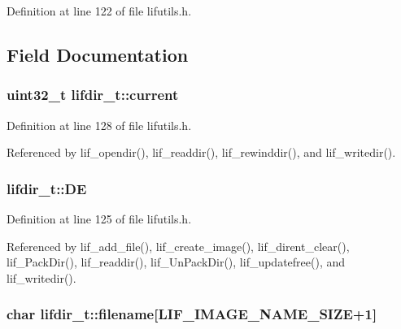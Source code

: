 Definition at line 122 of file lifutils.\+h.



\subsection{Field Documentation}
\subsubsection[{\texorpdfstring{current}{current}}]{\setlength{\rightskip}{0pt plus 5cm}uint32\+\_\+t lifdir\+\_\+t\+::current}\hypertarget{structlifdir__t_ae885e86a62d50c5b0c99ad2b63120e2c}{}\label{structlifdir__t_ae885e86a62d50c5b0c99ad2b63120e2c}


Definition at line 128 of file lifutils.\+h.



Referenced by lif\+\_\+opendir(), lif\+\_\+readdir(), lif\+\_\+rewinddir(), and lif\+\_\+writedir().

\subsubsection[{\texorpdfstring{DE}{DE}}]{ lifdir\+\_\+t\+::\+DE}\hypertarget{structlifdir__t_af9247c1579ce3fe0c57db9fd6b56c232}{}\label{structlifdir__t_af9247c1579ce3fe0c57db9fd6b56c232}


Definition at line 125 of file lifutils.\+h.



Referenced by lif\+\_\+add\+\_\+file(), lif\+\_\+create\+\_\+image(), lif\+\_\+dirent\+\_\+clear(), lif\+\_\+\+Pack\+Dir(), lif\+\_\+readdir(), lif\+\_\+\+Un\+Pack\+Dir(), lif\+\_\+updatefree(), and lif\+\_\+writedir().

\subsubsection[{\texorpdfstring{filename}{filename}}]{\setlength{\rightskip}{0pt plus 5cm}char lifdir\+\_\+t\+::filename\mbox{[}{\bf L\+I\+F\+\_\+\+I\+M\+A\+G\+E\+\_\+\+N\+A\+M\+E\+\_\+\+S\+I\+ZE}+1\mbox{]}}\hypertarget{structlifdir__t_a21bfa7a6d54009982cc63962951ba615}{}\label{structlifdir__t_a21bfa7a6d54009982cc63962951ba615}


